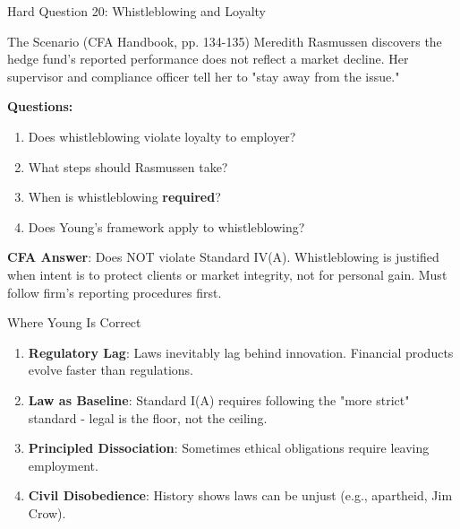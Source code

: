 \documentclass{beamer}
\begin{document}
	\begin{frame}{Hard Question 20: Whistleblowing and Loyalty}
		\begin{block}{The Scenario (CFA Handbook, pp. 134-135)}
			Meredith Rasmussen discovers the hedge fund's reported performance does not reflect a market decline. Her supervisor and compliance officer tell her to "stay away from the issue."
		\end{block}
		
		\vspace{0.2cm}
		\textbf{Questions:}
		\begin{enumerate}
			\item Does whistleblowing violate loyalty to employer?
			\item What steps should Rasmussen take?
			\item When is whistleblowing \textbf{required}?
			\item Does Young's framework apply to whistleblowing?
		\end{enumerate}
		
		\vspace{0.2cm}
		\textcolor{cfablue}{\textbf{CFA Answer}}: Does NOT violate Standard IV(A). Whistleblowing is justified when intent is to protect clients or market integrity, not for personal gain. Must follow firm's reporting procedures first.
	\end{frame}
	
	\begin{frame}{Where Young Is Correct}
		\begin{enumerate}
			\item \textbf{Regulatory Lag}: Laws inevitably lag behind innovation. Financial products evolve faster than regulations.
			\item \textbf{Law as Baseline}: Standard I(A) requires following the "more strict" standard - legal is the floor, not the ceiling.
			\item \textbf{Principled Dissociation}: Sometimes ethical obligations require leaving employment.
			\item \textbf{Civil Disobedience}: History shows laws can be unjust (e.g., apartheid, Jim Crow).
		\end{enumerate}
		\vspace{0.2cm}
		\begin{center}
		\end{center}
	\end{frame}
	
\end{document}
